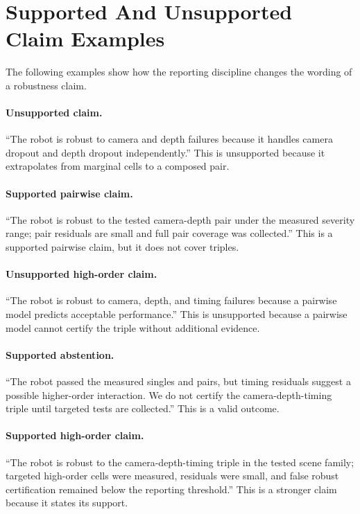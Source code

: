 \documentclass{article}
\begin{document}
\section{Supported And Unsupported Claim Examples}

The following examples show how the reporting discipline changes the wording of a robustness claim.

\paragraph{Unsupported claim.}
``The robot is robust to camera and depth failures because it handles camera dropout and depth dropout independently.'' This is unsupported because it extrapolates from marginal cells to a composed pair.

\paragraph{Supported pairwise claim.}
``The robot is robust to the tested camera-depth pair under the measured severity range; pair residuals are small and full pair coverage was collected.'' This is a supported pairwise claim, but it does not cover triples.

\paragraph{Unsupported high-order claim.}
``The robot is robust to camera, depth, and timing failures because a pairwise model predicts acceptable performance.'' This is unsupported because a pairwise model cannot certify the triple without additional evidence.

\paragraph{Supported abstention.}
``The robot passed the measured singles and pairs, but timing residuals suggest a possible higher-order interaction. We do not certify the camera-depth-timing triple until targeted tests are collected.'' This is a valid outcome.

\paragraph{Supported high-order claim.}
``The robot is robust to the camera-depth-timing triple in the tested scene family; targeted high-order cells were measured, residuals were small, and false robust certification remained below the reporting threshold.'' This is a stronger claim because it states its support.
\end{document}
